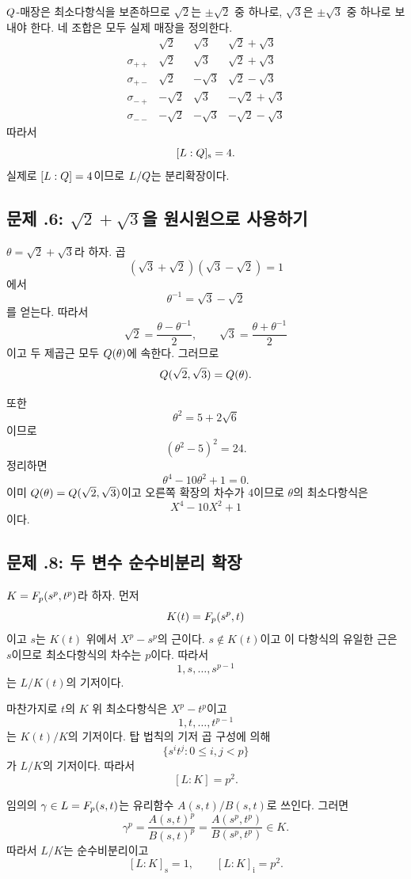 \begin{solution}
$Q$-매장은 최소다항식을 보존하므로 $\sqrt2$는 $\pm\sqrt2$ 중 하나로, $\sqrt3$은 $\pm\sqrt3$ 중 하나로 보내야 한다. 네 조합은 모두 실제 매장을 정의한다.
\[
\begin{array}{c|cc|c}
 & \sqrt2 & \sqrt3 & \sqrt2+\sqrt3\\
\hline
\sigma_{++}&\sqrt2&\sqrt3&\sqrt2+\sqrt3\\
\sigma_{+-}&\sqrt2&-\sqrt3&\sqrt2-\sqrt3\\
\sigma_{-+}&-\sqrt2&\sqrt3&-\sqrt2+\sqrt3\\
\sigma_{--}&-\sqrt2&-\sqrt3&-\sqrt2-\sqrt3
\end{array}
\]
따라서
\[
  [L:Q]_{\mathrm s}=4.
\]
실제로 $[L:Q]=4$이므로 $L/Q$는 분리확장이다.
\end{solution}

\subsection*{문제 \thechapter.6: $\sqrt2+\sqrt3$을 원시원으로 사용하기}

\begin{solution}
$\theta=\sqrt2+\sqrt3$라 하자. 곱
\[
  (\sqrt3+\sqrt2)(\sqrt3-\sqrt2)=1
\]
에서
\[
  \theta^{-1}=\sqrt3-\sqrt2
\]
를 얻는다. 따라서
\[
  \sqrt2=\frac{\theta-\theta^{-1}}2,
  \qquad
  \sqrt3=\frac{\theta+\theta^{-1}}2
\]
이고 두 제곱근 모두 $Q(\theta)$에 속한다. 그러므로
\[
  Q(\sqrt2,\sqrt3)=Q(\theta).
\]

또한
\[
  \theta^2=5+2\sqrt6
\]
이므로
\[
  (\theta^2-5)^2=24.
\]
정리하면
\[
  \theta^4-10\theta^2+1=0.
\]
이미 $Q(\theta)=Q(\sqrt2,\sqrt3)$이고 오른쪽 확장의 차수가 $4$이므로 $\theta$의 최소다항식은
\[
  X^4-10X^2+1
\]
이다.
\end{solution}

\subsection*{문제 \thechapter.8: 두 변수 순수비분리 확장}

\begin{solution}
$K=F_p(s^p,t^p)$라 하자. 먼저
\[
  K(t)=F_p(s^p,t)
\]
이고 $s$는 $K(t)$ 위에서 $X^p-s^p$의 근이다. $s\notin K(t)$이고 이 다항식의 유일한 근은 $s$이므로 최소다항식의 차수는 $p$이다. 따라서
\[
  1,s,\dots,s^{p-1}
\]
는 $L/K(t)$의 기저이다.

마찬가지로 $t$의 $K$ 위 최소다항식은 $X^p-t^p$이고
\[
  1,t,\dots,t^{p-1}
\]
는 $K(t)/K$의 기저이다. 탑 법칙의 기저 곱 구성에 의해
\[
  \{s^it^j:0\le i,j<p\}
\]
가 $L/K$의 기저이다. 따라서
\[
  [L:K]=p^2.
\]

임의의 $\gamma\in L=F_p(s,t)$는 유리함수 $A(s,t)/B(s,t)$로 쓰인다. 그러면
\[
  \gamma^p=\frac{A(s,t)^p}{B(s,t)^p}
  =\frac{A(s^p,t^p)}{B(s^p,t^p)}\in K.
\]
따라서 $L/K$는 순수비분리이고
\[
  [L:K]_{\mathrm s}=1,
  \qquad
  [L:K]_{\mathrm i}=p^2.
\]
\end{solution}

